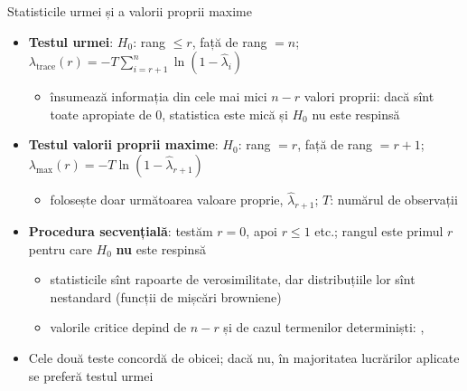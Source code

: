 \begin{frame}{Statisticile urmei și a valorii proprii maxime}
\itemsize{\small}
\begin{itemize}
    \item \textbf{Testul urmei}: $H_0$: rang $\le r$, față de rang $= n$; \quad $\lambda_{\mathrm{trace}}(r) = -T\sum_{i=r+1}^{n}\ln(1 - \hat\lambda_i)$
    \begin{itemize}
        \item însumează informația din cele mai mici $n - r$ valori proprii: dacă sînt toate apropiate de 0, statistica este mică și $H_0$ nu este respinsă
    \end{itemize}
    \item \textbf{Testul valorii proprii maxime}: $H_0$: rang $= r$, față de rang $= r + 1$; \quad $\lambda_{\max}(r) = -T\ln(1 - \hat\lambda_{r+1})$
    \begin{itemize}
        \item folosește doar următoarea valoare proprie, $\hat\lambda_{r+1}$; $T$: numărul de observații
    \end{itemize}
    \item \textbf{Procedura secvențială}: testăm $r = 0$, apoi $r \le 1$ etc.; rangul este primul $r$ pentru care $H_0$ \textbf{nu} este respinsă
    \begin{itemize}
        \item statisticile sînt rapoarte de verosimilitate, dar distribuțiile lor sînt nestandard (funcții de mișcări browniene)
        \item valorile critice depind de $n - r$ și de cazul termenilor determiniști: , 
    \end{itemize}
    \item Cele două teste concordă de obicei; dacă nu, în majoritatea lucrărilor aplicate se preferă testul urmei
\end{itemize}
\end{frame}

